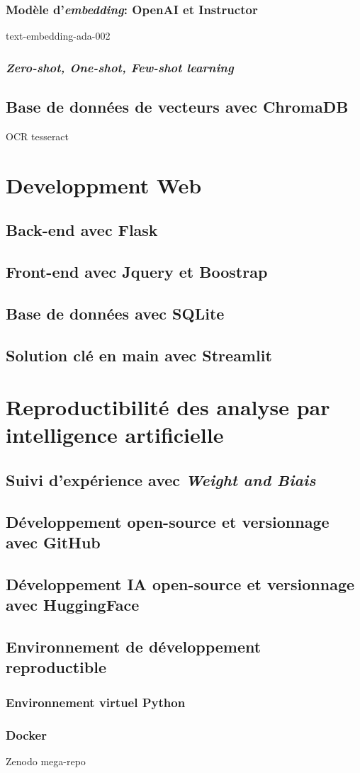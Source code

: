 \subsubsection{Modèle d'\textit{embedding}: OpenAI et Instructor}
text-embedding-ada-002
\subsubsection{\textit{Zero-shot, One-shot, Few-shot learning}}
\subsection{Base de données de vecteurs avec ChromaDB}
OCR tesseract
\section{Developpment Web}
\subsection{Back-end avec Flask}
\subsection{Front-end avec Jquery et Boostrap}
\subsection{Base de données avec SQLite}
\subsection{Solution clé en main avec Streamlit}
\section{Reproductibilité des analyse par intelligence artificielle}
\subsection{Suivi d'expérience avec \textit{Weight and Biais}}
\subsection{Développement open-source et versionnage avec GitHub}
\subsection{Développement IA open-source et versionnage avec HuggingFace}
\subsection{Environnement de développement reproductible}
\subsubsection{Environnement virtuel Python}
\subsubsection{Docker}

Zenodo mega-repo
